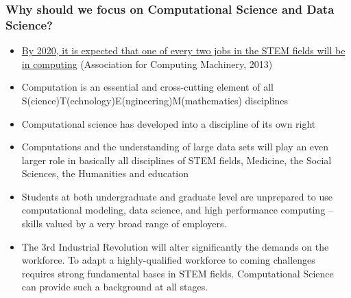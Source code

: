 \documentclass{beamer}
\begin{document}
\begin{frame}
\frametitle{Why should we focus on Computational Science and Data Science?}

\begin{block}{}
\begin{itemize}
\item \href{{http://pathways.acm.org/executive-summary.html}}{By 2020, it is expected that one of every two jobs in the STEM fields will be in computing} (Association for Computing Machinery, 2013)

\item Computation is an essential and cross-cutting element of all S(cience)T(echnology)E(ngineering)M(mathematics) disciplines

\item Computational science has developed into a discipline of its own right

\item Computations and the understanding of large data sets will play an even larger role in basically all disciplines of STEM fields, Medicine, the Social Sciences, the Humanities and  education

\item Students at both undergraduate and graduate level are unprepared to use computational modeling, data science, and high performance computing – skills valued by a very broad range of employers.

\item The 3rd Industrial Revolution will alter significantly the demands on the workforce. To adapt a highly-qualified workforce to coming challenges  requires strong fundamental bases in STEM fields. Computational Science can provide such a background at all stages.
\end{itemize}

\noindent
\end{block}
\end{frame}
\end{document}
